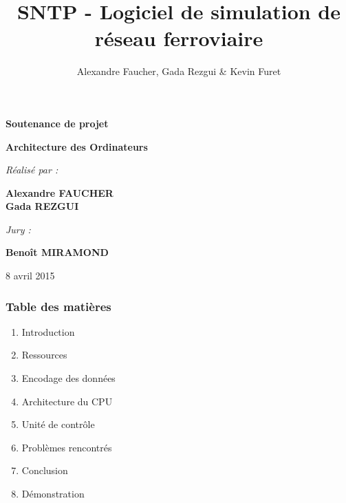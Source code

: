 \documentclass{beamer}
\title{SNTP - Logiciel de simulation de réseau ferroviaire}
\author{Alexandre Faucher, Gada Rezgui \& Kevin Furet}
\begin{document}

\begin{frame}
	\begin{center}

	{\Huge \textbf{Soutenance de projet}}

	\vspace*{0.3cm}

	{\large \textbf{Architecture des Ordinateurs}}

	\vspace*{0.5cm}

	\textit{Réalisé par :}

	{\large \textbf{Alexandre FAUCHER\\ Gada REZGUI}}

	\vspace*{0.5cm}

	\textit{Jury :}

	{\large \textbf{Benoît MIRAMOND}}

	\vspace*{0.5cm}

	{\large 8 avril 2015}

	\end{center}
\end{frame}



\begin{frame}
\frametitle{Table des matières}
\begin{enumerate}
	\item Introduction
	\item Ressources
	\item Encodage des données
	\item Architecture du CPU
	\item Unité de contrôle
	\item Problèmes rencontrés
	\item Conclusion
	\item Démonstration
\end{enumerate}
\end{frame}

\end{document}
